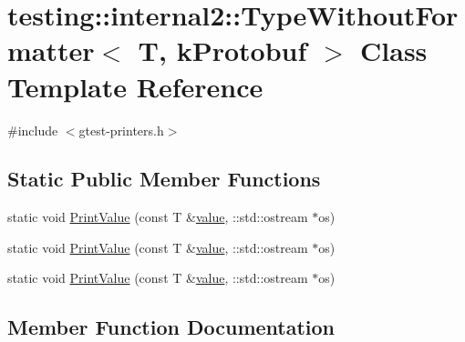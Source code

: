 \hypertarget{classtesting_1_1internal2_1_1_type_without_formatter_3_01_t_00_01k_protobuf_01_4}{}\section{testing\+::internal2\+::Type\+Without\+Formatter$<$ T, k\+Protobuf $>$ Class Template Reference}
\label{classtesting_1_1internal2_1_1_type_without_formatter_3_01_t_00_01k_protobuf_01_4}


{\ttfamily \#include $<$gtest-\/printers.\+h$>$}

\subsection*{Static Public Member Functions}
\begin{DoxyCompactItemize}
\item 
static void \mbox{\hyperlink{classtesting_1_1internal2_1_1_type_without_formatter_3_01_t_00_01k_protobuf_01_4_ac96fb775dc776f02da9a671ea0e04599}{Print\+Value}} (const T \&\mbox{\hyperlink{_obj__test_2lib_2googletest-master_2googlemock_2test_2gmock-matchers__test_8cc_a337b8a670efc0b086ad3af163f3121b6}{value}}, \+::std\+::ostream $\ast$os)
\item 
static void \mbox{\hyperlink{classtesting_1_1internal2_1_1_type_without_formatter_3_01_t_00_01k_protobuf_01_4_ac96fb775dc776f02da9a671ea0e04599}{Print\+Value}} (const T \&\mbox{\hyperlink{_obj__test_2lib_2googletest-master_2googlemock_2test_2gmock-matchers__test_8cc_a337b8a670efc0b086ad3af163f3121b6}{value}}, \+::std\+::ostream $\ast$os)
\item 
static void \mbox{\hyperlink{classtesting_1_1internal2_1_1_type_without_formatter_3_01_t_00_01k_protobuf_01_4_ac96fb775dc776f02da9a671ea0e04599}{Print\+Value}} (const T \&\mbox{\hyperlink{_obj__test_2lib_2googletest-master_2googlemock_2test_2gmock-matchers__test_8cc_a337b8a670efc0b086ad3af163f3121b6}{value}}, \+::std\+::ostream $\ast$os)
\end{DoxyCompactItemize}


\subsection{Member Function Documentation}
\mbox{\label{classtesting_1_1internal2_1_1_type_without_formatter_3_01_t_00_01k_protobuf_01_4_ac96fb775dc776f02da9a671ea0e04599}} 
